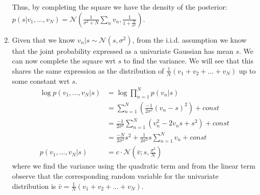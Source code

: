 \begin{enumerate}[label=\alph*.]
Thus, by completing the square we have the density of the posterior: $p(s|v_1,\dots,v_N) = \mathcal{N}(\frac{1}{\sigma^2 + N}\sum_{n}v_n, \frac{1}{1 + \frac{N}{\sigma^2}})$.

\item Given that we know $v_n|s \sim \mathcal{N}(s, \sigma^2)$, from the i.i.d. assumption we know that the joint probability expressed as a univariate Gaussian has mean $s$. We can now complete the square wrt $s$ to find the variance. We will see that this shares the same expression as the distribution of $\frac{1}{N}(v_1 +  v_2 + \dots + v_N)$ up to some constant wrt $s$.
\begin{align*}
\log p(v_1, \dots, v_N|s) &= \log \prod_{n=1}^N p(v_n|s) \\
&= \sum_{n=1}^N \left(\frac{-1}{2\sigma^2}(v_n - s)^2\right) + const\\
&= \frac{-1}{2\sigma^2}\sum_{n=1}^N \left(v_n^2 - 2v_n s + s^2\right) + const\\
&= \frac{-N}{2\sigma^2}s^2 + \frac{1}{2\sigma^2}s \sum_{n=1}^Nv_n + const\\
p(v_1, \dots, v_N|s) &= c\cdot\mathcal{N}(\bar{v}; s, \frac{\sigma^2}{N})
\end{align*}
where we find the variance using the quadratic term and from the linear term observe that the corresponding random variable for the univariate distribution is $\bar{v} = \frac{1}{N}(v_1 +  v_2 + \dots + v_N)$.


\end{enumerate}
